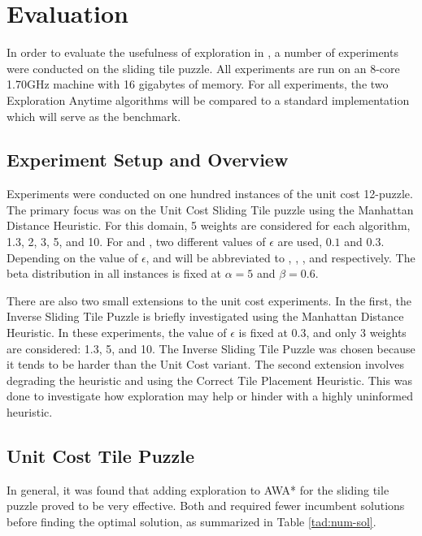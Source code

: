 \section{Evaluation}
In order to evaluate the usefulness of exploration in \awa, a number of experiments were conducted on the sliding tile puzzle. All experiments are run on an 8-core 1.70GHz machine with 16 gigabytes of memory. For all experiments, the two Exploration Anytime algorithms will be compared to a standard \awa implementation which will serve as the benchmark.

\subsection{Experiment Setup and Overview}
Experiments were conducted on one hundred instances of the unit cost 12-puzzle. The primary focus was on the Unit Cost Sliding Tile puzzle using the Manhattan Distance Heuristic. For this domain, 5 weights are considered for each algorithm, 1.3, 2, 3, 5, and 10. For \eawa and \ebawa, two different values of $\epsilon$ are used, $0.1$ and $0.3$. Depending on the value of $\epsilon$, \eawa and \ebawa will be abbreviated to , , , and  respectively. The beta distribution in all \ebawa instances is fixed at $\alpha=5$ and $\beta=0.6$.

There are also two small extensions to the unit cost experiments. In the first, the Inverse Sliding Tile Puzzle is briefly investigated using the Manhattan Distance Heuristic. In these experiments, the value of $\epsilon$ is fixed at 0.3, and only 3 weights are considered: 1.3, 5, and 10. The Inverse Sliding Tile Puzzle was chosen because it tends to be harder than the Unit Cost variant. The second extension involves degrading the heuristic and using the Correct Tile Placement Heuristic. This was done to investigate how exploration may help or hinder with a highly uninformed heuristic.

\subsection{Unit Cost Tile Puzzle}
In general, it was found that adding exploration to AWA* for the sliding tile puzzle proved to be very effective. Both \eawa and \ebawa required fewer incumbent solutions before finding the optimal solution, as summarized in Table \ref{tad:num-sol}.

